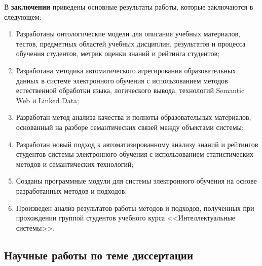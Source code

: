 В \textbf{заключении} приведены основные результаты работы, которые заключаются в следующем:
\begin{enumerate}
 \item Разработаны онтологические модели для описания учебных материалов, тестов, предметных областей учебных дисциплин, результатов и процесса обучения студентов, метрик оценки знаний и рейтинга студентов;
 \item Разработана методика автоматического агрегирования образовательных данных в системе электронного обучения с использованием методов естественной обработки языка, логического вывода, технологий Semantic Web и Linked Data;
 \item Разработан метод анализа качества и полноты образовательных материалов, основанный на разборе семантических связей между объектами системы;
  \item Разработан новый подход к автоматизированному анализу знаний и рейтингов студентов системы электронного обучения с использованием статистических методов и семантических технологий;
  \item Созданы программные модули для системы электронного обучения на основе разработанных методов и подходов;
  \item Произведен анализ результатов работы методов и подходов, полученных при прохождении группой студентов учебного курса <<Интеллектуальные системы>>.
  \end{enumerate}




\subsection*{\Large Научные работы по теме диссертации}
% 

\renewcommand{\refname}{Другие научные работы:}
\nocite{*}
